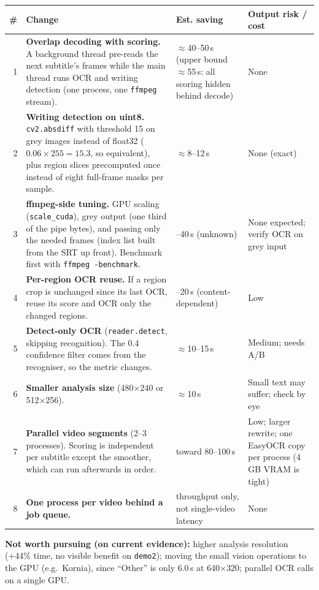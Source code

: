 \documentclass[11pt]{article}
\begin{document}
\begingroup\small
\renewcommand{\arraystretch}{1.15}
\begin{tabularx}{\textwidth}{r >{\raggedright\arraybackslash}X >{\raggedright\arraybackslash}p{3.1cm} >{\raggedright\arraybackslash}p{3.4cm}}
\toprule
\# & Change & Est. saving & Output risk / cost \\
\midrule
1 & \textbf{Overlap decoding with scoring.} A background thread pre-reads the next subtitle's frames while the main thread runs OCR and writing detection (one process, one \texttt{ffmpeg} stream). & $\approx$40--50\,s (upper bound $\approx$55\,s: all scoring hidden behind decode) & None \\
2 & \textbf{Writing detection on uint8.} \texttt{cv2.absdiff} with threshold 15 on grey images instead of float32 ($0.06\times255=15.3$, so equivalent), plus region slices precomputed once instead of eight full-frame masks per sample. & $\approx$8--12\,s & None (exact) \\
3 & \textbf{ffmpeg-side tuning.} GPU scaling (\texttt{scale\_cuda}), grey output (one third of the pipe bytes), and passing only the needed frames (index list built from the SRT up front). Benchmark first with \texttt{ffmpeg -benchmark}. & 0--40\,s (unknown) & None expected; verify OCR on grey input \\
4 & \textbf{Per-region OCR reuse.} If a region crop is unchanged since its last OCR, reuse its score and OCR only the changed regions. & 0--20\,s (content-dependent) & Low \\
5 & \textbf{Detect-only OCR} (\texttt{reader.detect}, skipping recognition). The 0.4 confidence filter comes from the recogniser, so the metric changes. & $\approx$10--15\,s & Medium; needs A/B \\
6 & \textbf{Smaller analysis size} (480$\times$240 or 512$\times$256). & $\approx$10\,s & Small text may suffer; check by eye \\
7 & \textbf{Parallel video segments} (2--3 processes). Scoring is independent per subtitle except the smoother, which can run afterwards in order. & toward 80--100\,s & Low; larger rewrite; one EasyOCR copy per process (4\,GB VRAM is tight) \\
8 & \textbf{One process per video behind a job queue.} & throughput only, not single-video latency & None \\
\bottomrule
\end{tabularx}
\endgroup

\medskip
\textbf{Not worth pursuing (on current evidence):} higher analysis resolution (+44\% time, no visible benefit on \texttt{demo2}); moving the small vision operations to the GPU (e.g.\ Kornia), since ``Other'' is only 6.0\,s at 640$\times$320; parallel OCR calls on a single GPU.
\end{document}
